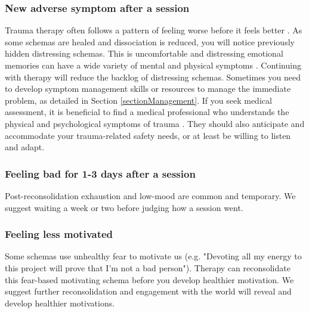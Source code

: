 \documentclass[12pt,letterpaper]{article}
\begin{document}
\subsubsection{New adverse symptom after a session}
Trauma therapy often follows a pattern of feeling worse before it feels better \cite{vanderKolkBody}. As some schemas are healed and dissociation is reduced, you will notice previously hidden distressing schemas. This is uncomfortable and distressing emotional memories can have a wide variety of mental and physical symptoms \cite{kroenkeSomatic,henningsenSomatic}. Continuing with therapy will reduce the backlog of distressing schemas. Sometimes you need to develop symptom management skills or resources to manage the immediate problem, as detailed in Section \ref{sectionManagement}. If you seek medical assessment, it is beneficial to find a medical professional who understands the physical and psychological symptoms of trauma \cite{rajaTraumaInformedCare}. They should also anticipate and accommodate your trauma-related safety needs, or at least be willing to listen and adapt. 
\subsubsection{Feeling bad for 1-3 days after a session}
Post-reconsolidation exhaustion and low-mood are common and temporary. We suggest waiting a week or two before judging how a session went. 
\subsubsection{Feeling less motivated} 
Some schemas use unhealthy fear to motivate us (e.g. "Devoting all my energy to this project will prove that I'm not a bad person"). Therapy can reconsolidate this fear-based motivating schema before you develop healthier motivation. We suggest further reconsolidation and engagement with the world will reveal and develop healthier motivations.
\end{document}
